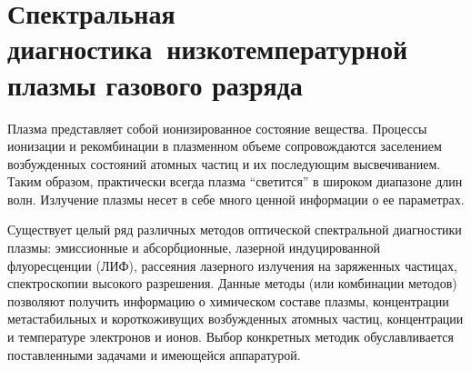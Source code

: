 \chapter{Спектральная диагностика~низкотемпературной плазмы газового разряда}
\label{cha:ch_1}

Плазма представляет собой ионизированное состояние вещества. Процессы
ионизации и рекомбинации в плазменном объеме сопровождаются заселением
возбужденных состояний атомных частиц и их последующим высвечиванием.
Таким образом, практически всегда плазма “светится” в широком диапазоне длин
волн. Излучение плазмы несет в себе много ценной информации о ее параметрах.

Существует целый ряд различных методов оптической спектральной
диагностики плазмы: эмиссионные и абсорбционные, лазерной индуцированной
флуоресценции (ЛИФ), рассеяния лазерного излучения на заряженных частицах,
спектроскопии высокого разрешения. Данные методы (или комбинации методов)
позволяют получить информацию о химическом составе плазмы, концентрации
метастабильных и короткоживущих возбужденных атомных частиц, концентрации
и температуре электронов и ионов. Выбор конкретных методик обуславливается
поставленными задачами и имеющейся аппаратурой.

